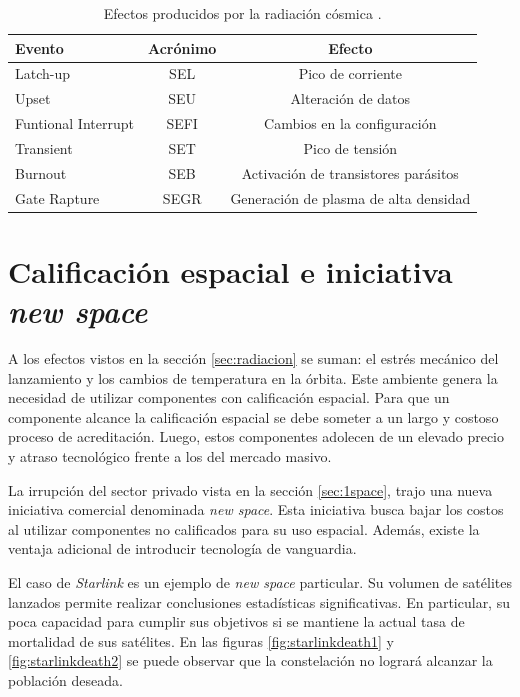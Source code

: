 \begin{table}[h]
	\centering
	\caption[Efectos de la radiación cósmica]{Efectos producidos por la radiación cósmica \citep{WEBSITE:structure_space_radiation}.}
	\begin{tabular}{l c c}    
		\toprule
		\textbf{Evento}      & \textbf{Acrónimo} & \textbf{Efecto}\\
		\midrule
		Latch-up             & SEL               & Pico de corriente\\		
		Upset                & SEU               & Alteración de datos\\
		Funtional Interrupt  & SEFI              & Cambios en la configuración\\
		Transient            & SET               & Pico de tensión\\
		Burnout              & SEB               & Activación de transistores parásitos\\
		Gate Rapture         & SEGR              & Generación de plasma de alta densidad\\
		\bottomrule
		\hline
	\end{tabular}
	\label{tab:radiacion}
\end{table}

\newpage
\section{Calificación espacial e iniciativa \emph{new space}}
\label{sec:newspace}

A los efectos vistos en la sección \ref{sec:radiacion} se suman: el estrés mecánico del lanzamiento y los cambios de temperatura en la órbita.
Este ambiente genera la necesidad de utilizar componentes con calificación espacial.
Para que un componente alcance la calificación espacial se debe someter a un largo y costoso proceso de acreditación.
Luego, estos componentes adolecen de un elevado precio y atraso tecnológico frente a los del mercado masivo.

La irrupción del sector privado vista en la sección \ref{sec:1space}, trajo una nueva iniciativa comercial denominada \emph{new space}.
Esta iniciativa busca bajar los costos al utilizar componentes no calificados para su uso espacial.
Además, existe la ventaja adicional de introducir tecnología de vanguardia.


El caso de \emph{Starlink} es un ejemplo de \emph{new space} particular.
Su volumen de satélites lanzados permite realizar conclusiones estadísticas significativas.
En particular, su poca capacidad para cumplir sus objetivos si se mantiene la actual tasa de mortalidad de sus satélites.
En las figuras \ref{fig:starlinkdeath1} y \ref{fig:starlinkdeath2} se puede observar que la constelación no logrará alcanzar la población deseada.

